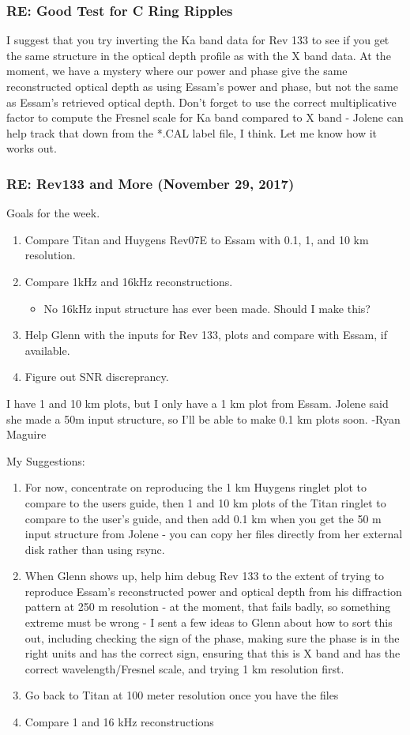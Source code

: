 \documentclass[crop=false,class=book]{standalone}
\begin{document}
\subsubsection{\footnotesize RE: Good Test for C Ring Ripples}
I suggest that you try inverting the Ka band data for Rev 133 to see if you get the same structure in the optical depth profile as with the X band data. At the moment, we have a mystery where our power and phase give the same reconstructed optical depth as using Essam's power and phase, but not the same as Essam's retrieved optical depth. Don't forget to use the correct multiplicative factor to compute the Fresnel scale for Ka band compared to X band - Jolene can help track that down from the *.CAL  label file, I think. Let me know how it works out.
\subsubsection{\footnotesize RE: Rev133 and More (November 29, 2017)}
Goals for the week.
\begin{enumerate}
    \item Compare Titan and Huygens Rev07E to Essam with 0.1, 1, and 10 km resolution.
    \item Compare 1kHz and 16kHz reconstructions.
    \begin{itemize}
        \item No 16kHz input structure has ever been made. Should I make this?
    \end{itemize}
    \item Help Glenn with the inputs for Rev 133, plots and compare with Essam, if available.
    \item Figure out SNR discreprancy.
\end{enumerate}
I have 1 and 10 km plots, but I only have a 1 km plot from Essam. Jolene said she made a 50m input structure, so I'll be able to make 0.1 km plots soon. -Ryan Maguire\par
My Suggestions:
\begin{enumerate}
    \item For now, concentrate on reproducing the 1 km Huygens ringlet plot to compare to the users guide, then 1 and 10 km plots of the Titan ringlet to compare to the user's guide, and then add 0.1 km when you get the 50 m input structure from Jolene - you can copy her files directly from her external disk rather than using rsync. 
    \item When Glenn shows up, help him debug Rev 133 to the extent of trying to reproduce Essam's reconstructed power and optical depth from his diffraction pattern at 250 m resolution - at the moment, that fails badly, so something extreme must be wrong - I sent a few ideas to Glenn about how to sort this out, including checking the sign of the phase, making sure the phase is in the right units and has the correct sign, ensuring that this is X band and has the correct wavelength/Fresnel scale, and trying 1 km resolution first. 
    \item Go back to Titan at 100 meter resolution once you have the files
    \item Compare 1 and 16 kHz reconstructions
\end{enumerate}
\end{document}
